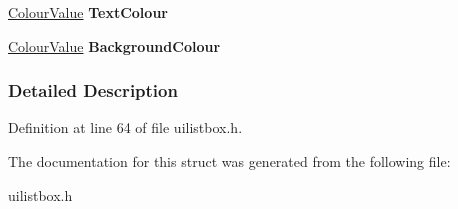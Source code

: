 \begin{DoxyCompactItemize}
\item 
\hypertarget{structphys_1_1UI_1_1ListBox_1_1TemplateParams_a766986b3df2bdd14b12cf7ba84b01ef6}{
\hyperlink{classphys_1_1ColourValue}{ColourValue} {\bfseries TextColour}}
\label{structphys_1_1UI_1_1ListBox_1_1TemplateParams_a766986b3df2bdd14b12cf7ba84b01ef6}

\item 
\hypertarget{structphys_1_1UI_1_1ListBox_1_1TemplateParams_a319bb787c2596381fe98d687f706ca0d}{
\hyperlink{classphys_1_1ColourValue}{ColourValue} {\bfseries BackgroundColour}}
\label{structphys_1_1UI_1_1ListBox_1_1TemplateParams_a319bb787c2596381fe98d687f706ca0d}

\end{DoxyCompactItemize}


\subsubsection{Detailed Description}


Definition at line 64 of file uilistbox.h.



The documentation for this struct was generated from the following file:\begin{DoxyCompactItemize}
\item 
uilistbox.h\end{DoxyCompactItemize}
